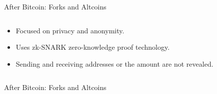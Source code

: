 \documentclass[]{beamer}
\begin{document}
\begin{frame}{After Bitcoin: Forks and Altcoins}
\begin{columns}
		\begin{small}
			\begin{itemize}
				\item Focused on privacy and anonymity.
				\item Uses zk-SNARK zero-knowledge proof technology.
				\item Sending and receiving addresses or the amount are not revealed.
			\end{itemize}
		\end{small}
	\end{columns}	
\end{frame}


\begin{frame}{After Bitcoin: Forks and Altcoins}
	\begin{columns}
			\begin{figure}
			\end{figure}
\end{columns}
\end{frame}
\end{document}
